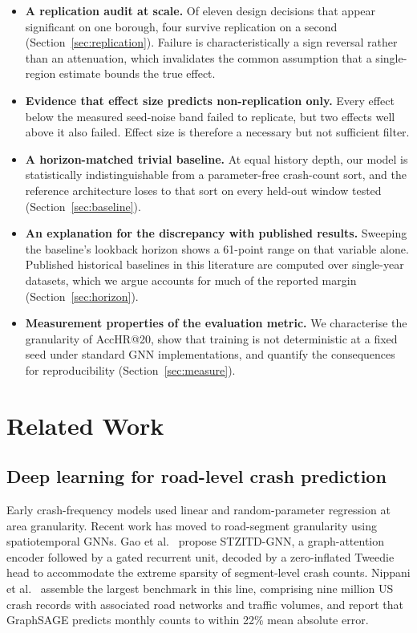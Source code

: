 \documentclass[conference]{IEEEtran}
\begin{document}
\begin{itemize}
\item \textbf{A replication audit at scale.} Of eleven design decisions
that appear significant on one borough, four survive replication on a
second (Section~\ref{sec:replication}). Failure is characteristically a
sign reversal rather than an attenuation, which invalidates the common
assumption that a single-region estimate bounds the true effect.

\item \textbf{Evidence that effect size predicts non-replication only.}
Every effect below the measured seed-noise band failed to replicate, but
two effects well above it also failed. Effect size is therefore a
necessary but not sufficient filter.

\item \textbf{A horizon-matched trivial baseline.} At equal history depth,
our model is statistically indistinguishable from a parameter-free
crash-count sort, and the reference architecture loses to that sort on
every held-out window tested (Section~\ref{sec:baseline}).

\item \textbf{An explanation for the discrepancy with published results.}
Sweeping the baseline's lookback horizon shows a 61-point range on that
variable alone. Published historical baselines in this literature are
computed over single-year datasets, which we argue accounts for much of
the reported margin (Section~\ref{sec:horizon}).

\item \textbf{Measurement properties of the evaluation metric.} We
characterise the granularity of AccHR@20, show that training is not
deterministic at a fixed seed under standard GNN implementations, and
quantify the consequences for reproducibility (Section~\ref{sec:measure}).
\end{itemize}

\section{Related Work}

\subsection{Deep learning for road-level crash prediction}

Early crash-frequency models used linear and random-parameter regression
at area granularity. Recent work has moved to road-segment granularity
using spatiotemporal GNNs. Gao et al.~\cite{gao2024} propose STZITD-GNN, a
graph-attention encoder followed by a gated recurrent unit, decoded by a
zero-inflated Tweedie head to accommodate the extreme sparsity of
segment-level crash counts. Nippani et al.~\cite{nippani2023} assemble the
largest benchmark in this line, comprising nine million US crash records
with associated road networks and traffic volumes, and report that
GraphSAGE predicts monthly counts to within 22\% mean absolute error.
\end{document}
